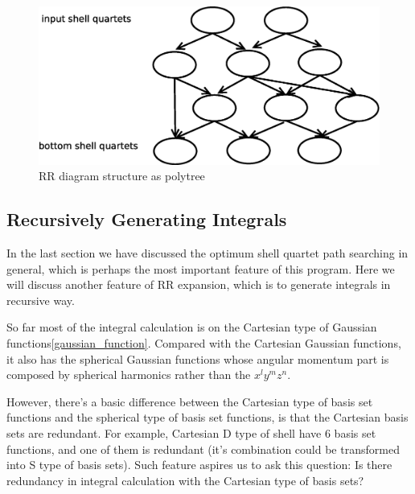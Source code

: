  \begin{figure}[htb]
 \centering
 \includegraphics[scale=0.5]{./rr_as_polytree.eps}
 \caption{RR diagram structure as polytree}
 \label{fig:2}
\end{figure}

\subsection{Recursively Generating Integrals}
%
%
%
\label{rr_intereal_gen}
In the last section we have discussed the optimum shell quartet
path searching in general, which is perhaps the most important feature of 
this program. Here we will discuss another feature of RR expansion,
which is to generate integrals in recursive way.

So far most of the integral calculation is on the Cartesian type 
of Gaussian functions\ref{gaussian_function}. 
Compared with the Cartesian Gaussian functions, it also has 
the spherical Gaussian functions whose angular momentum part is  
composed by spherical harmonics rather than the $x^{l}y^{m}z^{n}$. 

However, there's a basic difference between the Cartesian type of 
basis set functions and the spherical type of basis set functions, is 
that the Cartesian basis sets are redundant. For example, Cartesian
D type of shell have 6 basis set functions, and one of them is 
redundant (it's combination could be transformed into S type of 
basis sets). Such feature aspires us to ask this question:
Is there redundancy in integral calculation with the Cartesian
type of basis sets?

